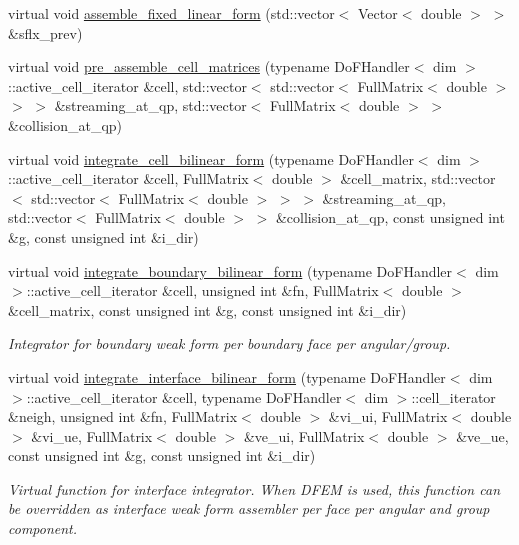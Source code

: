 \begin{DoxyCompactItemize}
virtual void \hyperlink{class_equation_base_aa6a5d3dd752c1e2389b329c141c44ee7}{assemble\+\_\+fixed\+\_\+linear\+\_\+form} (std\+::vector$<$ Vector$<$ double $>$ $>$ \&sflx\+\_\+prev)
\item 
virtual void \hyperlink{class_equation_base_a39f0465a523e038302f624f89c08a2ee}{pre\+\_\+assemble\+\_\+cell\+\_\+matrices} (typename Do\+F\+Handler$<$ dim $>$\+::active\+\_\+cell\+\_\+iterator \&cell, std\+::vector$<$ std\+::vector$<$ Full\+Matrix$<$ double $>$ $>$ $>$ \&streaming\+\_\+at\+\_\+qp, std\+::vector$<$ Full\+Matrix$<$ double $>$ $>$ \&collision\+\_\+at\+\_\+qp)
\item 
virtual void \hyperlink{class_equation_base_a7421b3c18433975ac794ac22c3af715a}{integrate\+\_\+cell\+\_\+bilinear\+\_\+form} (typename Do\+F\+Handler$<$ dim $>$\+::active\+\_\+cell\+\_\+iterator \&cell, Full\+Matrix$<$ double $>$ \&cell\+\_\+matrix, std\+::vector$<$ std\+::vector$<$ Full\+Matrix$<$ double $>$ $>$ $>$ \&streaming\+\_\+at\+\_\+qp, std\+::vector$<$ Full\+Matrix$<$ double $>$ $>$ \&collision\+\_\+at\+\_\+qp, const unsigned int \&g, const unsigned int \&i\+\_\+dir)
\item 
virtual void \hyperlink{class_equation_base_ae294806284f671619cac9e7169ffff8d}{integrate\+\_\+boundary\+\_\+bilinear\+\_\+form} (typename Do\+F\+Handler$<$ dim $>$\+::active\+\_\+cell\+\_\+iterator \&cell, unsigned int \&fn, Full\+Matrix$<$ double $>$ \&cell\+\_\+matrix, const unsigned int \&g, const unsigned int \&i\+\_\+dir)
\begin{DoxyCompactList}\small\item\em Integrator for boundary weak form per boundary face per angular/group. \end{DoxyCompactList}\item 
virtual void \hyperlink{class_equation_base_af56caa04c80d8f388e116307930d0063}{integrate\+\_\+interface\+\_\+bilinear\+\_\+form} (typename Do\+F\+Handler$<$ dim $>$\+::active\+\_\+cell\+\_\+iterator \&cell, typename Do\+F\+Handler$<$ dim $>$\+::cell\+\_\+iterator \&neigh, unsigned int \&fn, Full\+Matrix$<$ double $>$ \&vi\+\_\+ui, Full\+Matrix$<$ double $>$ \&vi\+\_\+ue, Full\+Matrix$<$ double $>$ \&ve\+\_\+ui, Full\+Matrix$<$ double $>$ \&ve\+\_\+ue, const unsigned int \&g, const unsigned int \&i\+\_\+dir)
\begin{DoxyCompactList}\small\item\em Virtual function for interface integrator. When D\+F\+EM is used, this function can be overridden as interface weak form assembler per face per angular and group component. \end{DoxyCompactList}\item 

\end{DoxyCompactItemize}
